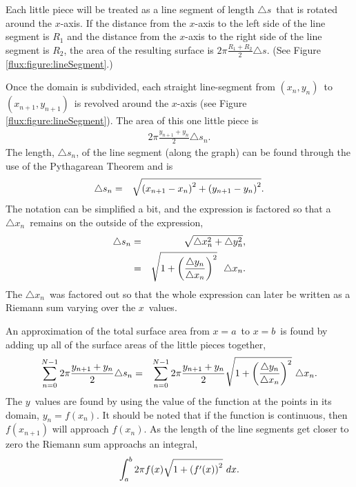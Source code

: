 Each little piece will be treated as a line segment of length
$\triangle s$\ that is rotated around the $x$-axis. If the distance
from the $x$-axis to the left side of the line segment is $R_1$ and
the distance from the $x$-axis to the right side of the line segment
is $R_2$, the area of the resulting surface is
$2\pi\frac{R_1+R_2}{2}\triangle s$. (See Figure
\ref{flux:figure:lineSegment}.)

Once the domain is subdivided, each straight line-segment from
$(x_n,y_n)$\ to $(x_{n+1},y_{n+1})$\ is revolved around the $x$-axis
(see Figure \ref{flux:figure:lineSegment}). The area of this one little
piece is
\begin{eqnarray*}
  2 \pi \frac{y_{n+1}+y_n}{2} \triangle s_n.
\end{eqnarray*}
The length, $\triangle s_n$, of the line segment (along the graph) can
be found through the use of the Pythagarean Theorem and is
\begin{eqnarray*}
  \triangle s_n & = & \sqrt{\left( x_{n+1}-x_n \right)^2 +
    \left( y_{n+1}-y_n \right)^2}.
\end{eqnarray*}
The notation can be simplified a bit, and the expression is factored
so that a $\triangle x_n$\ remains on the outside of the expression,
\begin{eqnarray*}
\triangle s_n  & = & \sqrt{ \triangle x_n^2 +  \triangle y_n^2}, \\
  & = & \sqrt{ 1 +  \left( \frac{\triangle y_n}{\triangle x_n} \right)^2}
  ~~ \triangle x_n.
\end{eqnarray*}
The $\triangle x_n$\ was factored out so that the whole expression can
later be written as a Riemann sum varying over the $x$\ values.

An approximation of the total surface area from $x=a$\ to $x=b$\ is
found by adding up all of the surface areas of the little pieces
together,
\begin{eqnarray}
  \sum^{N-1}_{n=0} 2 \pi \frac{y_{n+1}+y_n}{2}\triangle s_n & = &
  \sum^{N-1}_{n=0} 2 \pi \frac{y_{n+1}+y_n}{2}
  \sqrt{ 1 +  \left( \frac{\triangle y_n}{\triangle x_n} \right)^2} ~ \triangle x_n.
  \label{flux:eqn:riemann}
\end{eqnarray}
The $y$\ values are found by using the value of the function at the
points in its domain, $y_n=f(x_n)$. It should be noted that if the function is continuous,
then $f(x_{n+1})$ will approach $f(x_n)$.  As the length of the line segments
get closer to zero the Riemann sum approachs an integral,
\begin{eqnarray*}
  \int^b_a 2 \pi f(x) \sqrt{1+\left( f'(x)\right)^2} ~ dx.
\end{eqnarray*}




